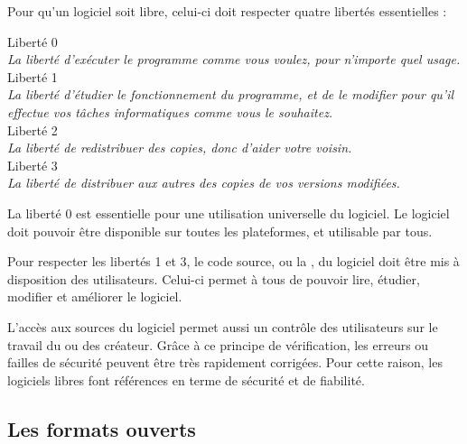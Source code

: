 
Pour qu’un logiciel soit libre, celui-ci doit respecter quatre libertés essentielles :

\begin{center}
\begin{minipage}{0.8\textwidth}
\begin{center}
\textcolor{Cdl}{\large Liberté 0} \\ \textit{La liberté d'exécuter le programme comme vous voulez, pour n'importe quel usage.} \\
\textcolor{Cdl}{\large Liberté 1} \\ \textit{La liberté d'étudier le fonctionnement du programme, et de le modifier pour qu'il effectue vos tâches informatiques comme vous le souhaitez.} \\
\textcolor{Cdl}{\large Liberté 2} \\ \textit{La liberté de redistribuer des copies, donc d'aider votre voisin.} \\
\textcolor{Cdl}{\large Liberté 3} \\ \textit{La liberté de distribuer aux autres des copies de vos versions modifiées.}
\end{center}
\end{minipage}
\end{center}

La \textcolor{Cdl}{liberté 0} est essentielle pour une utilisation universelle du logiciel. Le logiciel doit pouvoir être disponible sur toutes les plateformes, et utilisable par tous.

\Separateur

Pour respecter les \textcolor{Cdl}{libertés 1 et 3}, le code source, ou la , du logiciel doit être mis à disposition des utilisateurs. Celui-ci permet à tous de pouvoir lire, étudier, modifier et améliorer le logiciel.

\Separateur

L’accès aux \textcolor{Cdl}{sources} du logiciel permet aussi un contrôle des utilisateurs sur le travail du ou des créateur. Grâce à ce principe de vérification, les erreurs ou failles de sécurité peuvent être très rapidement corrigées. Pour cette raison, les logiciels libres font références en terme de sécurité et de fiabilité.

\subsection{Les formats ouverts}

